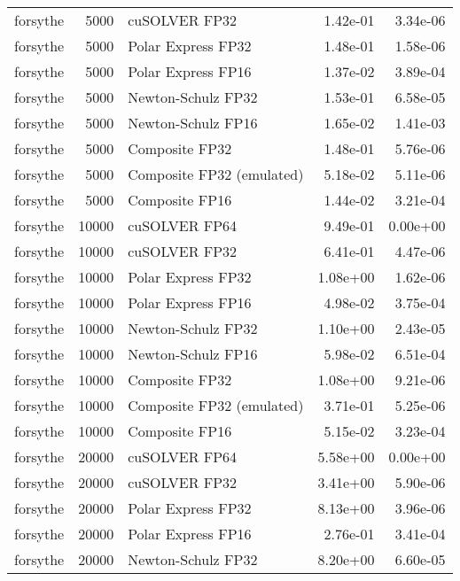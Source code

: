 \begin{table}
\begin{tabular}{lrlrr}
 forsythe &  5000 &             cuSOLVER FP32 &  1.42e-01 &        3.34e-06 \\
 forsythe &  5000 &        Polar Express FP32 &  1.48e-01 &        1.58e-06 \\
 forsythe &  5000 &        Polar Express FP16 &  1.37e-02 &        3.89e-04 \\
 forsythe &  5000 &        Newton-Schulz FP32 &  1.53e-01 &        6.58e-05 \\
 forsythe &  5000 &        Newton-Schulz FP16 &  1.65e-02 &        1.41e-03 \\
 forsythe &  5000 &            Composite FP32 &  1.48e-01 &        5.76e-06 \\
 forsythe &  5000 & Composite FP32 (emulated) &  5.18e-02 &        5.11e-06 \\
 forsythe &  5000 &            Composite FP16 &  1.44e-02 &        3.21e-04 \\
 forsythe & 10000 &             cuSOLVER FP64 &  9.49e-01 &        0.00e+00 \\
 forsythe & 10000 &             cuSOLVER FP32 &  6.41e-01 &        4.47e-06 \\
 forsythe & 10000 &        Polar Express FP32 &  1.08e+00 &        1.62e-06 \\
 forsythe & 10000 &        Polar Express FP16 &  4.98e-02 &        3.75e-04 \\
 forsythe & 10000 &        Newton-Schulz FP32 &  1.10e+00 &        2.43e-05 \\
 forsythe & 10000 &        Newton-Schulz FP16 &  5.98e-02 &        6.51e-04 \\
 forsythe & 10000 &            Composite FP32 &  1.08e+00 &        9.21e-06 \\
 forsythe & 10000 & Composite FP32 (emulated) &  3.71e-01 &        5.25e-06 \\
 forsythe & 10000 &            Composite FP16 &  5.15e-02 &        3.23e-04 \\
 forsythe & 20000 &             cuSOLVER FP64 &  5.58e+00 &        0.00e+00 \\
 forsythe & 20000 &             cuSOLVER FP32 &  3.41e+00 &        5.90e-06 \\
 forsythe & 20000 &        Polar Express FP32 &  8.13e+00 &        3.96e-06 \\
 forsythe & 20000 &        Polar Express FP16 &  2.76e-01 &        3.41e-04 \\
 forsythe & 20000 &        Newton-Schulz FP32 &  8.20e+00 &        6.60e-05 \\

\end{tabular}
\end{table}
